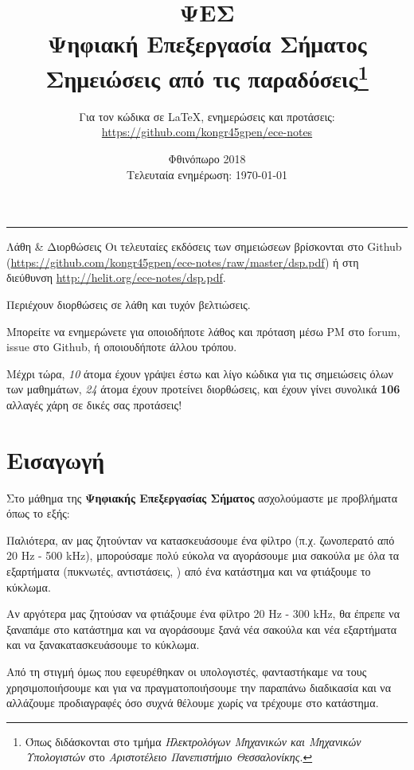 \documentclass[11pt,a4paper,notitlepage,fleqn]{article}
\title{ΨΕΣ
	\\
	{ 
		\normalsize Ψηφιακή Επεξεργασία Σήματος
		\\
		\normalsize Σημειώσεις από τις παραδόσεις\footnote{Όπως διδάσκονται στο τμήμα \textit{Ηλεκτρολόγων Μηχανικών και Μηχανικών Υπολογιστών} στο \textit{Αριστοτέλειο Πανεπιστήμιο Θεσσαλονίκης}.}
	}}
\date{Φθινόπωρο 2018
	\\
	{ 
		\small Τελευταία ενημέρωση: \today
	}
}
\author{
	Για τον κώδικα σε \LaTeX, ενημερώσεις και προτάσεις:
	\\
	\url{https://github.com/kongr45gpen/ece-notes}}
\let\mytodo\todo
\renewcommand{\todo}[1]{\par\mytodo[inline,noline]{#1}}
\begin{document}
\maketitle

\hrule
\vspace{50pt}

\begin{infobox}{Λάθη \& Διορθώσεις}
	Οι τελευταίες εκδόσεις των σημειώσεων βρίσκονται στο Github
	(\url{https://github.com/kongr45gpen/ece-notes/raw/master/dsp.pdf}) ή
	στη διεύθυνση \url{http://helit.org/ece-notes/dsp.pdf}.
	
	Περιέχουν διορθώσεις σε λάθη και τυχόν βελτιώσεις.
	
	\tcblower
	
	Μπορείτε να ενημερώνετε για οποιοδήποτε λάθος και πρόταση
	μέσω PM στο forum, issue στο Github, ή οποιουδήποτε άλλου τρόπου.
	
	Μέχρι τώρα, \emph{10} άτομα έχουν γράψει έστω και λίγο κώδικα για τις σημειώσεις όλων των μαθημάτων, \emph{24} άτομα έχουν προτείνει διορθώσεις, και έχουν γίνει συνολικά \textbf{106} αλλαγές χάρη σε δικές σας προτάσεις!
\end{infobox}

\todo{Add PDF links}

{
	\hypersetup{linkcolor=black}
	\listoflecture
	\tableofcontents
}

\newpage

\section{Εισαγωγή}

	
Στο μάθημα της \textbf{Ψηφιακής Επεξεργασίας Σήματος} ασχολούμαστε
με προβλήματα όπως το εξής:

Παλιότερα, αν μας ζητούνταν να κατασκευάσουμε ένα φίλτρο (π.χ.
ζωνοπερατό από 20 Hz - 500 kHz), μπορούσαμε πολύ εύκολα να αγοράσουμε μια σακούλα με
όλα τα εξαρτήματα (πυκνωτές, αντιστάσεις, \textellipsis) από ένα
κατάστημα και να φτιάξουμε το κύκλωμα.

Αν αργότερα μας ζητούσαν να φτιάξουμε ένα φίλτρο 20 Hz - 300 kHz, θα
έπρεπε να ξαναπάμε στο κατάστημα και να αγοράσουμε ξανά νέα σακούλα και νέα εξαρτήματα
και να ξανακατασκευάσουμε το κύκλωμα.

Από τη στιγμή όμως που εφευρέθηκαν οι υπολογιστές, φανταστήκαμε να τους
χρησιμοποιήσουμε και για να πραγματοποιήσουμε την παραπάνω διαδικασία και
να αλλάζουμε προδιαγραφές όσο συχνά θέλουμε χωρίς να τρέχουμε στο κατάστημα.
\end{document}

